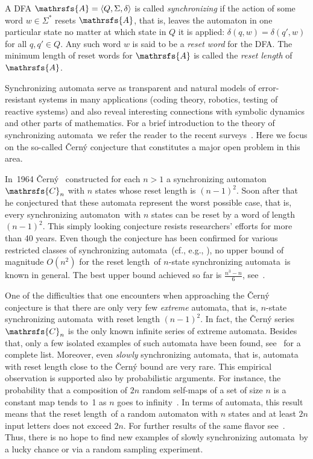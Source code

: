 \documentclass[11pt]{llncs}
\newcommand{\sa}{synchronizing automata}
\newcommand{\san}{synchronizing automaton}
\newcommand{\rl}{reset length}
\begin{document}
A DFA $\mathrsfs{A}=\langle Q,\Sigma,\delta\rangle$ is called
\emph{synchronizing} if the action of some word $w\in\Sigma^*$
resets $\mathrsfs{A}$, that is, leaves the automaton in one
particular state no matter at which state in $Q$ it is applied:
$\delta(q,w)=\delta(q',w)$ for all $q,q'\in Q$. Any such word $w$
is said to be a \emph{reset word} for the DFA. The minimum length
of reset words for $\mathrsfs{A}$ is called the \emph{\rl} of
$\mathrsfs{A}$.

Synchronizing automata serve as transparent and natural models of
error-resistant systems in many applications (coding theory, robotics,
testing of reactive systems) and also reveal interesting connections
with symbolic dynamics and other parts of mathematics. For a brief
introduction to the theory of \sa\ we refer the reader to the recent
surveys~\cite{Sa05,Vo08}. Here we focus on the so-called \v{C}ern\'{y}
conjecture that constitutes a major open problem in this area.

In~1964 \v{C}ern\'{y}~\cite{Ce64} constructed for each $n>1$ a \san\
$\mathrsfs{C}_n$ with $n$ states whose reset length is $(n-1)^2$.
Soon after that he conjectured that these automata represent
the worst possible case, that is, every \san\ with $n$ states
can be reset by a word of length $(n-1)^2$. This simply looking conjecture
resists researchers' efforts for more than 40 years. Even though the
conjecture has been confirmed for various restricted classes of \sa\
(cf., e.g., \cite{Ep90,Du98,Ka03,Tr07,Tr08,AS09,Vo09}), no upper bound of magnitude
$O(n^2)$ for the \rl\ of $n$-state \sa\ is known in general. The best upper
bound achieved so far is $\frac{n^3-n}6$, see~\cite{Pi83}.

One of the difficulties that one encounters when approaching the \v{C}ern\'{y}
conjecture is that there are only very few \emph{extreme} automata, that is,
$n$-state \sa\ with reset length $(n-1)^2$. In fact, the \v{C}ern\'{y} series
$\mathrsfs{C}_n$ is the only known infinite series of extreme automata. Besides
that, only a few isolated examples of such automata have been found, see~\cite{Vo08}
for a complete list. Moreover, even \emph{slowly} \sa, that is, automata with reset
length close to the \v{C}ern\'{y} bound are very rare. This empirical observation
is supported also by probabilistic arguments. For instance, the probability that
a composition of $2n$ random self-maps of a set of size $n$ is a constant map
tends to~1 as $n$ goes to infinity~\cite{Hi88}. In terms of automata, this
result means that the \rl\ of a random automaton with $n$ states and at least
$2n$ input letters does not exceed $2n$. For further results of the same
flavor see~\cite{SZ}. Thus, there is no hope to find new examples of slowly
\sa\ by a lucky chance or via a random sampling experiment.
\end{document}
